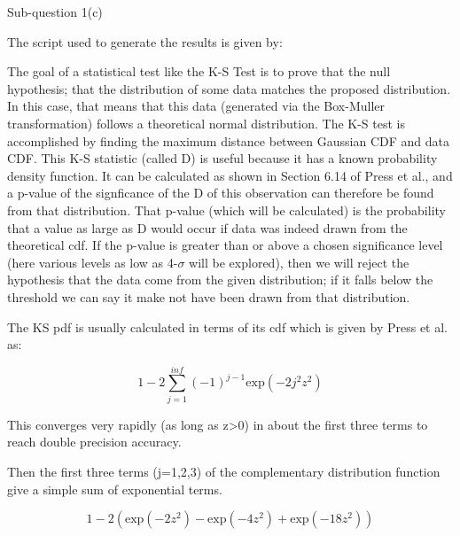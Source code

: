 \FloatBarrier

\begin{subsection}{Sub-question 1(c)}

The script used to generate the results is given by:
  


The goal of a statistical test like the K-S Test is to prove that the null hypothesis; that the distribution of some data matches the proposed distribution. In this case, that means that this data (generated via the Box-Muller transformation) follows a theoretical normal distribution. The K-S test is accomplished by finding the maximum distance between Gaussian CDF and data CDF. This K-S statistic (called D) is useful because it has a known probability density function. It can be calculated as shown in Section 6.14 of Press et al., and a p-value of the signficance of the D of this observation can therefore be found from that distribution. That p-value (which will be calculated) is the probability that a value as large as D would occur if data was indeed drawn from the theoretical cdf. If the p-value is greater than or above a chosen significance level (here various levels as low as 4-$\sigma$ will be explored), then we will  reject the hypothesis that the data come from the given distribution; if it falls below the threshold we can say it make not have been drawn from that distribution.

The KS pdf is usually calculated in terms of its cdf which is given by Press et al. as:

\begin{equation}
  1-2\sum_{j=1}^{inf}(-1)^{j-1}\text{exp}(-2j^2z^2)
\end{equation}

This converges very rapidly (as long as z>0) in about the first three terms to reach double precision accuracy.

Then the first three terms (j=1,2,3) of the complementary distribution function give a simple sum of exponential terms.

\begin{equation}
  1-2\left( \text{exp}(-2z^2) - \text{exp}(-4z^2) + \text{exp}(-18z^2)\right)
\end{equation}


\end{subsection}
